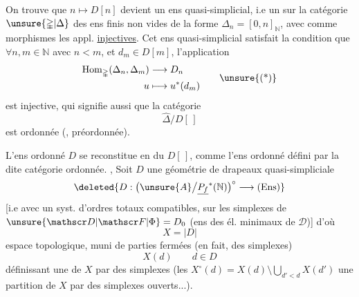 On trouve que $n\longmapsto D[n]$ devient un ens quasi-simplicial, i.e un  sur la catégorie $\unsure{\mathbb{\Delta}|\Delta}$ des ens finis non vides de la forme $\Delta_n=[0,n]_{\mathbb N}$, avec comme
morphismes les appl. \uline{injectives}. Cet ens quasi-simplicial satisfait la condition que
$\forall n,m\in\mathbb N$ avec $n<m$, et $d_m\in D[m]$, l'application
\[
\begin{aligned}
\mathrm{Hom}_{\mathbb{\Delta}}(\Delta_n,\Delta_m)&\longrightarrow D_n\\
u&\longmapsto u^*(d_m)
\end{aligned}\tag*{\unsure{(*)}}
\]
est injective, qui signifie aussi que la catégorie
\[
\widehat{\mathbb{\Delta}}/D[\,]
\]
est ordonnée (, préordonnée).

L'ens ordonné $D$ se reconstitue en   du $D[\,]$, comme l'ens ordonné  défini par la dite catégorie ordonnée. , 
Soit $D$ une géométrie de drapeaux quasi-simpliciale
\[
\deleted{D:\bigl(\unsure{A}\big/\underline{P_f}^{*}(\mathbb N)\bigr)^{\circ}\longrightarrow(\mathrm{Ens})}
\]
[i.e avec  un syst. d'ordres totaux compatibles, sur les simplexes de $\unsure{\mathscr D|\mathscr F|\Phi}=D_0$ (ens des él. minimaux de $\mathscr D$)]
d'où
\[
X=|D|
\]
espace topologique, muni de parties fermées (en fait, des simplexes)
\[
X(d)\qquad d\in D
\]
définissant une    de $X$ par des simplexes (les $X^{\circ}(d)=X(d)\setminus\bigcup_{d'<d}X(d')$  une partition de $X$ par des simplexes ouverts...).

